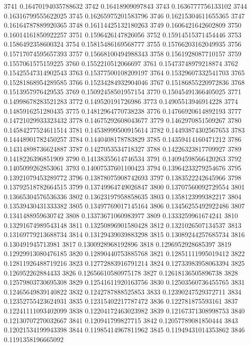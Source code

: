 3741 0.16470194035788632
3742 0.16418909097843
3743 0.1636777756133102
3744 0.16316799555622025
3745 0.16265975201583796
3746 0.16215304611655365
3747 0.16164787889920365
3748 0.16114425132180263
3749 0.1606421642602809
3750 0.16014161850922257
3751 0.1596426147826056
3752 0.15914515371454446
3753 0.1586492358600324
3754 0.15815486169568777
3755 0.15766203162049935
3756 0.15717074595657393
3757 0.15668100494988343
3758 0.1561928087710157
3759 0.1557061575159225
3760 0.1552210512066697
3761 0.15473748979218874
3762 0.15425547314902543
3763 0.15377500108209197
3764 0.15329607332541703
3765 0.15281868954289585
3766 0.15234284932904046
3767 0.15186855220972836
3768 0.1513957976429535
3769 0.15092458501957154
3770 0.15045491366405025
3771 0.14998678283521283
3772 0.149520191726986
3773 0.14905513946914228
3774 0.1485916251280435
3775 0.14812964770738238
3776 0.14766920614892193
3777 0.14721029933323432
3778 0.14675292608043677
3779 0.1462970851509267
3780 0.14584277524611514
3781 0.14538999500915614
3782 0.14493874302567653
3783 0.14448901782450257
3784 0.1440408178783829
3785 0.14359414160471212
3786 0.14314898736624887
3787 0.1427053534718327
3788 0.14226323817709927
3789 0.1418226396851909
3790 0.14138355614746534
3791 0.14094598566420263
3792 0.1405099262853061
3793 0.14007537601100423
3794 0.13964233279254676
3795 0.13921079453289772
3796 0.13878075908742693
3797 0.1383522242645966
3798 0.13792518782664515
3799 0.13749964749026847
3800 0.13707560092729554
3801 0.13665304576536336
3802 0.13623197958858635
3803 0.1358123999382217
3804 0.13539430431333382
3805 0.13497769017145164
3806 0.13456255492922486
3807 0.1341488959630742
3808 0.13373671060983977
3809 0.1333259961674241
3810 0.13291674989543148
3811 0.13250896901580428
3812 0.1321026507134537
3813 0.13169779213688734
3814 0.13129439039883298
3815 0.13089244257685734
3816 0.130491945713981
3817 0.1300928968192896
3818 0.1296952928685397
3819 0.12929913080476185
3820 0.12890440753885768
3821 0.12851111995019412
3822 0.12811926488719216
3823 0.12772883916791214
3824 0.12733983958063394
3825 0.126952262884433
3826 0.12656610580975178
3827 0.12618136505896738
3828 0.12579803730695308
3829 0.12541611920163756
3830 0.12503560736455765
3831 0.12465649839140822
3832 0.1242787888525853
3833 0.12390247529372711
3834 0.12352755423624931
3835 0.12315402217787472
3836 0.122781875593161
3837 0.12241111093402099
3838 0.12204172463023982
3839 0.12167371308998753
3840 0.12130707270032667
3841 0.120941799827715
3842 0.12057789081850444
3843 0.12021534199943398
3844 0.11985414967811962
3845 0.11949431014353862
3846 0.1191358196665092
